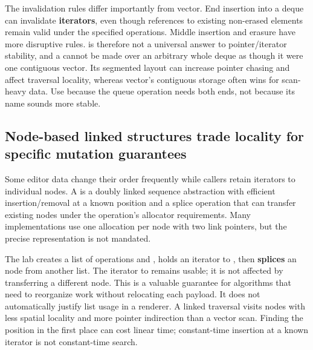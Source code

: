 The invalidation rules differ importantly from vector. End insertion into a deque can invalidate \textbf{iterators}, even though references to existing non-erased elements remain valid under the specified operations. Middle insertion and erasure have more disruptive rules.  is therefore not a universal answer to pointer/iterator stability, and a  cannot be made over an arbitrary whole deque as though it were one contiguous vector. Its segmented layout can increase pointer chasing and affect traversal locality, whereas vector's contiguous storage often wins for scan-heavy data. Use  because the queue operation needs both ends, not because its name sounds more stable.

\subsection{Node-based linked structures trade locality for specific mutation guarantees}\label{01-foundations-i-ch006-node-based-linked-structures-trade-locality-for-specific-mutation-guarantees}

\hypertarget{01-foundations-i-ch006-node-based-linked-structures-trade-locality-for-specific-mutation-guarantees}{}

Some editor data change their order frequently while callers retain iterators to individual nodes. A  is a doubly linked sequence abstraction with efficient insertion/removal at a known position and a splice operation that can transfer existing nodes under the operation's allocator requirements. Many implementations use one allocation per node with two link pointers, but the precise representation is not mandated.

The lab creates a list of operations  and , holds an iterator to , then \textbf{splices} an  node from another list. The iterator to  remains usable; it is not affected by transferring a different node. This is a valuable guarantee for algorithms that need to reorganize work without relocating each payload. It does not automatically justify list usage in a renderer. A linked traversal visits nodes with less spatial locality and more pointer indirection than a vector scan. Finding the position in the first place can cost linear time; constant-time insertion at a known iterator is not constant-time search.

